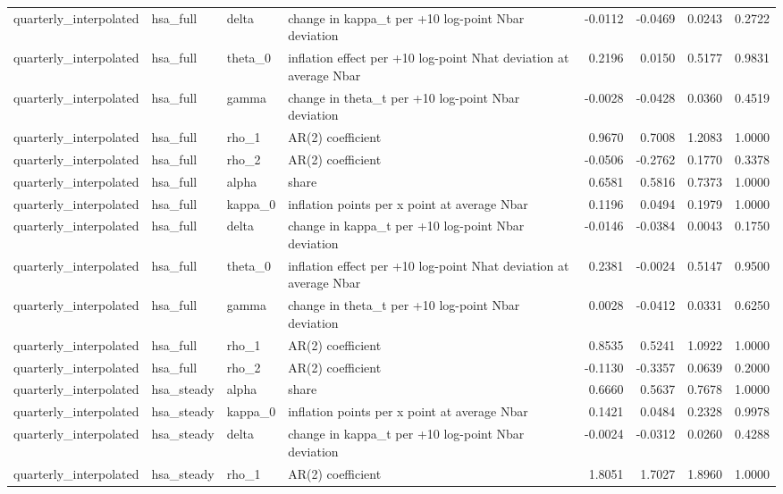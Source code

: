 \begin{tabular}{llllrrrr}
quarterly\_interpolated & hsa\_full & delta & change in kappa\_t per +10 log-point Nbar deviation & -0.0112 & -0.0469 & 0.0243 & 0.2722 \\
quarterly\_interpolated & hsa\_full & theta\_0 & inflation effect per +10 log-point Nhat deviation at average Nbar & 0.2196 & 0.0150 & 0.5177 & 0.9831 \\
quarterly\_interpolated & hsa\_full & gamma & change in theta\_t per +10 log-point Nbar deviation & -0.0028 & -0.0428 & 0.0360 & 0.4519 \\
quarterly\_interpolated & hsa\_full & rho\_1 & AR(2) coefficient & 0.9670 & 0.7008 & 1.2083 & 1.0000 \\
quarterly\_interpolated & hsa\_full & rho\_2 & AR(2) coefficient & -0.0506 & -0.2762 & 0.1770 & 0.3378 \\
quarterly\_interpolated & hsa\_full & alpha & share & 0.6581 & 0.5816 & 0.7373 & 1.0000 \\
quarterly\_interpolated & hsa\_full & kappa\_0 & inflation points per x point at average Nbar & 0.1196 & 0.0494 & 0.1979 & 1.0000 \\
quarterly\_interpolated & hsa\_full & delta & change in kappa\_t per +10 log-point Nbar deviation & -0.0146 & -0.0384 & 0.0043 & 0.1750 \\
quarterly\_interpolated & hsa\_full & theta\_0 & inflation effect per +10 log-point Nhat deviation at average Nbar & 0.2381 & -0.0024 & 0.5147 & 0.9500 \\
quarterly\_interpolated & hsa\_full & gamma & change in theta\_t per +10 log-point Nbar deviation & 0.0028 & -0.0412 & 0.0331 & 0.6250 \\
quarterly\_interpolated & hsa\_full & rho\_1 & AR(2) coefficient & 0.8535 & 0.5241 & 1.0922 & 1.0000 \\
quarterly\_interpolated & hsa\_full & rho\_2 & AR(2) coefficient & -0.1130 & -0.3357 & 0.0639 & 0.2000 \\
quarterly\_interpolated & hsa\_steady & alpha & share & 0.6660 & 0.5637 & 0.7678 & 1.0000 \\
quarterly\_interpolated & hsa\_steady & kappa\_0 & inflation points per x point at average Nbar & 0.1421 & 0.0484 & 0.2328 & 0.9978 \\
quarterly\_interpolated & hsa\_steady & delta & change in kappa\_t per +10 log-point Nbar deviation & -0.0024 & -0.0312 & 0.0260 & 0.4288 \\
quarterly\_interpolated & hsa\_steady & rho\_1 & AR(2) coefficient & 1.8051 & 1.7027 & 1.8960 & 1.0000 \\

\end{tabular}
